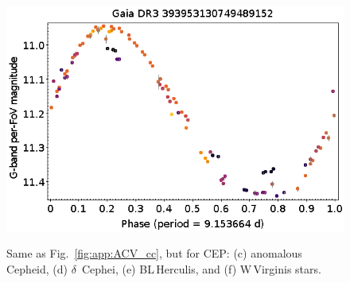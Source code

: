 \documentclass[longauth]{aa}
\begin{document}
\begin{appendix}
\begin{figure}
\hspace{2mm}
 \includegraphics[width=0.45\hsize]{figures/appendix/W_VIR-77.png} \\
\vspace{4mm}
 \caption{Same as Fig.~\ref{fig:app:ACV_cc}, but for CEP: (c) anomalous Cepheid, (d) $\delta$~Cephei, (e) BL\,Herculis, and (f) W\,Virginis stars.}
 \label{fig:app:CEP_cc}
\end{figure}




\end{appendix}
\end{document}
